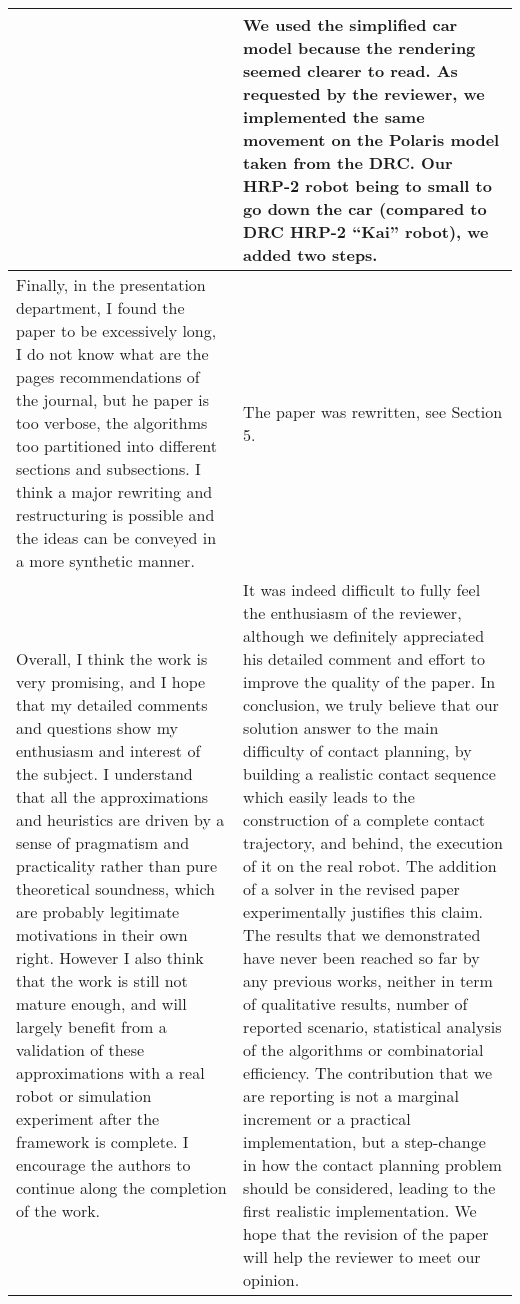 \documentclass[a4paper]{article}
\begin{document}
\begin{longtable}{|p{21em}|p{21em}|}
&
We used the simplified car model because the rendering seemed clearer to read.
As requested by the reviewer, we implemented the same movement on the Polaris model taken from the DRC.
Our HRP-2 robot being to small to go down the car (compared to DRC HRP-2 ``Kai'' robot), we added two steps.
\\ \hline %
Finally, in the presentation department, I found the paper to be excessively long, I do not know what are the pages recommendations of the journal, but he paper is too verbose, the algorithms too partitioned into different sections and subsections. I think a major rewriting and restructuring is possible and the ideas can be conveyed in a more synthetic manner.
&
The paper was rewritten, see Section 5.
\\ \hline %
Overall, I think the work is very promising, and I hope that my detailed comments and questions show my enthusiasm and interest of the subject. I understand that all the approximations and heuristics are driven by a sense of  pragmatism and practicality rather than pure theoretical soundness, which are probably legitimate motivations in their own right. However I also think that the work is still not mature enough, and will largely benefit from a validation of these approximations with a real robot or simulation experiment after the framework is complete. I encourage the authors to continue along the completion of the work.
&
It was indeed difficult to fully feel the enthusiasm of the reviewer, although we definitely appreciated his detailed comment and effort to improve the quality of the paper.
In conclusion, we truly believe that our solution answer to the main difficulty of contact planning, by building a realistic contact sequence which easily leads to the construction of a complete contact trajectory, and behind, the execution of it on the real robot.
The addition of a \mP3 solver in the revised paper experimentally justifies this claim.
The results that we demonstrated have never been reached so far by any previous works, neither in term of qualitative results, number of reported scenario, statistical analysis of the algorithms or combinatorial efficiency.
The contribution that we are reporting is not a marginal increment or a practical implementation, but a step-change in how the contact planning problem should be considered, leading to the first realistic implementation.
We hope that the revision of the paper will help the reviewer to meet our opinion.

\\ \hline %
\end{longtable}
\end{document}
